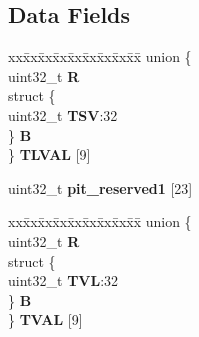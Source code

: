 \subsection*{Data Fields}
\begin{DoxyCompactItemize}
\item 
\mbox{\label{structPIT__tag_a8c0c6f122db229c8d6cf4fd179ff9a1f}} 
\begin{tabbing}
xx\=xx\=xx\=xx\=xx\=xx\=xx\=xx\=xx\=\kill
union \{\\
\>uint32\_t {\bfseries R}\\
\>struct \{\\
\>\>uint32\_t {\bfseries TSV}:32\\
\>\} {\bfseries B}\\
\} {\bfseries TLVAL} \mbox{[}9\mbox{]}\\

\end{tabbing}\item 
\mbox{\label{structPIT__tag_a548045057a4a91bdbf15dbfc48cb94e0}} 
uint32\+\_\+t {\bfseries pit\+\_\+reserved1} \mbox{[}23\mbox{]}
\item 
\mbox{\label{structPIT__tag_a121e6c584ab695fb55a71c519fec3b54}} 
\begin{tabbing}
xx\=xx\=xx\=xx\=xx\=xx\=xx\=xx\=xx\=\kill
union \{\\
\>uint32\_t {\bfseries R}\\
\>struct \{\\
\>\>uint32\_t {\bfseries TVL}:32\\
\>\} {\bfseries B}\\
\} {\bfseries TVAL} \mbox{[}9\mbox{]}\\


\end{tabbing}
\end{DoxyCompactItemize}
